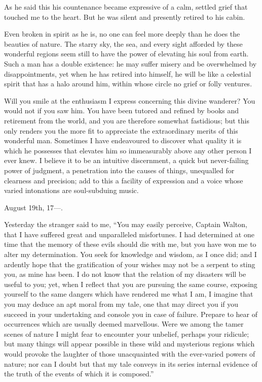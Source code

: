 \documentclass[12pt,openright]{book}
\begin{document}
As he said this his countenance became expressive of a calm, settled grief that touched me to the heart. But he was silent and presently retired to his cabin.

Even broken in spirit as he is, no one can feel more deeply than he does the beauties of nature. The starry sky, the sea, and every sight afforded by these wonderful regions seem still to have the power of elevating his soul from earth. Such a man has a double existence: he may suffer misery and be overwhelmed by disappointments, yet when he has retired into himself, he will be like a celestial spirit that has a halo around him, within whose circle no grief or folly ventures.

Will you smile at the enthusiasm I express concerning this divine wanderer? You would not if you saw him. You have been tutored and refined by books and retirement from the world, and you are therefore somewhat fastidious; but this only renders you the more fit to appreciate the extraordinary merits of this wonderful man. Sometimes I have endeavoured to discover what quality it is which he possesses that elevates him so immeasurably above any other person I ever knew. I believe it to be an intuitive discernment, a quick but never-failing power of judgment, a penetration into the causes of things, unequalled for clearness and precision; add to this a facility of expression and a voice whose varied intonations are soul-subduing music.

August 19th, 17—.

Yesterday the stranger said to me, “You may easily perceive, Captain Walton, that I have suffered great and unparalleled misfortunes. I had determined at one time that the memory of these evils should die with me, but you have won me to alter my determination. You seek for knowledge and wisdom, as I once did; and I ardently hope that the gratification of your wishes may not be a serpent to sting you, as mine has been. I do not know that the relation of my disasters will be useful to you; yet, when I reflect that you are pursuing the same course, exposing yourself to the same dangers which have rendered me what I am, I imagine that you may deduce an apt moral from my tale, one that may direct you if you succeed in your undertaking and console you in case of failure. Prepare to hear of occurrences which are usually deemed marvellous. Were we among the tamer scenes of nature I might fear to encounter your unbelief, perhaps your ridicule; but many things will appear possible in these wild and mysterious regions which would provoke the laughter of those unacquainted with the ever-varied powers of nature; nor can I doubt but that my tale conveys in its series internal evidence of the truth of the events of which it is composed.”
\end{document}
